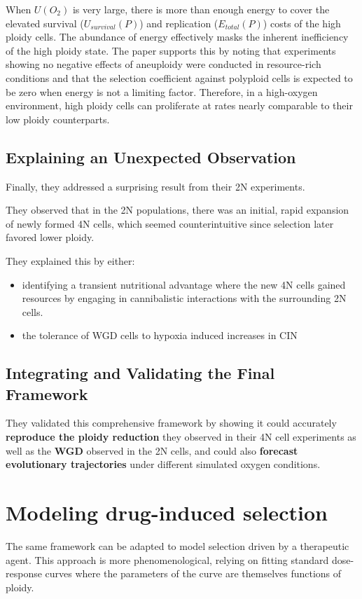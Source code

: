 \documentclass{article}
\begin{document}
When $U(O_2)$ is very large, there is more than enough energy to cover the elevated survival ($U_{survival}(P)$) and replication ($E_{total}(P)$) costs of the high ploidy cells. The abundance of energy effectively masks the inherent inefficiency of the high ploidy state. The paper supports this by noting that experiments showing no negative effects of aneuploidy were conducted in resource-rich conditions and that the selection coefficient against polyploid cells is expected to be zero when energy is not a limiting factor. Therefore, in a high-oxygen environment, high ploidy cells can proliferate at rates nearly comparable to their low ploidy counterparts.


\subsection{Explaining an Unexpected Observation}
Finally, they addressed a surprising result from their 2N experiments.

They observed that in the 2N populations, there was an initial, rapid expansion of newly formed 4N cells, which seemed counterintuitive since selection later favored lower ploidy.

They explained this by either:
\color{blue}
\begin{itemize}
    \item identifying a transient nutritional advantage where the new 4N cells gained resources by engaging in cannibalistic interactions with the surrounding 2N cells.
    \item the tolerance of WGD cells to hypoxia induced increases in CIN
\end{itemize}
\color{black}

\subsection{Integrating and Validating the Final Framework}
\color{blue}
 They validated this comprehensive framework by showing it could accurately \textbf{reproduce the ploidy reduction} they observed in their 4N cell experiments as well as the \textbf{WGD} observed in the 2N cells, and could also \textbf{forecast evolutionary trajectories} under different simulated oxygen conditions.
\color{black}



\section{Modeling drug-induced selection }
The same framework can be adapted to model selection driven by a therapeutic agent. This approach is more phenomenological, relying on fitting standard dose-response curves where the parameters of the curve are themselves functions of ploidy.
\end{document}
